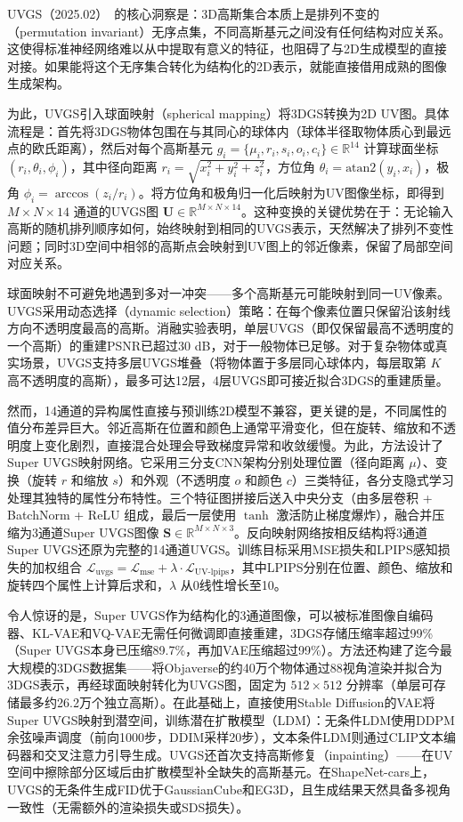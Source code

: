 UVGS（2025.02）~\cite{2502_01846}的核心洞察是：3D高斯集合本质上是排列不变的（permutation invariant）无序点集，不同高斯基元之间没有任何结构对应关系。这使得标准神经网络难以从中提取有意义的特征，也阻碍了与2D生成模型的直接对接。如果能将这个无序集合转化为结构化的2D表示，就能直接借用成熟的图像生成架构。

为此，UVGS引入球面映射（spherical mapping）将3DGS转换为2D UV图。具体流程是：首先将3DGS物体包围在与其同心的球体内（球体半径取物体质心到最远点的欧氏距离），然后对每个高斯基元 $g_i = \{\mu_i, r_i, s_i, o_i, c_i\} \in \mathbb{R}^{14}$ 计算球面坐标 $(r_i, \theta_i, \phi_i)$，其中径向距离 $r_i = \sqrt{x_i^2 + y_i^2 + z_i^2}$，方位角 $\theta_i = \text{atan2}(y_i, x_i)$，极角 $\phi_i = \arccos(z_i / r_i)$。将方位角和极角归一化后映射为UV图像坐标，即得到 $M \times N \times 14$ 通道的UVGS图 $\mathbf{U} \in \mathbb{R}^{M \times N \times 14}$。这种变换的关键优势在于：无论输入高斯的随机排列顺序如何，始终映射到相同的UVGS表示，天然解决了排列不变性问题；同时3D空间中相邻的高斯点会映射到UV图上的邻近像素，保留了局部空间对应关系。

球面映射不可避免地遇到多对一冲突——多个高斯基元可能映射到同一UV像素。UVGS采用动态选择（dynamic selection）策略：在每个像素位置只保留沿该射线方向不透明度最高的高斯。消融实验表明，单层UVGS（即仅保留最高不透明度的一个高斯）的重建PSNR已超过30 dB，对于一般物体已足够。对于复杂物体或真实场景，UVGS支持多层UVGS堆叠（将物体置于多层同心球体内，每层取第 $K$ 高不透明度的高斯），最多可达12层，4层UVGS即可接近拟合3DGS的重建质量。

然而，14通道的异构属性直接与预训练2D模型不兼容，更关键的是，不同属性的值分布差异巨大。邻近高斯在位置和颜色上通常平滑变化，但在旋转、缩放和不透明度上变化剧烈，直接混合处理会导致梯度异常和收敛缓慢。为此，方法设计了Super UVGS映射网络。它采用三分支CNN架构分别处理位置（径向距离 $\mu$）、变换（旋转 $r$ 和缩放 $s$）和外观（不透明度 $o$ 和颜色 $c$）三类特征，各分支隐式学习处理其独特的属性分布特性。三个特征图拼接后送入中央分支（由多层卷积 + BatchNorm + ReLU 组成，最后一层使用 $\tanh$ 激活防止梯度爆炸），融合并压缩为3通道Super UVGS图像 $\mathbf{S} \in \mathbb{R}^{M \times N \times 3}$。反向映射网络按相反结构将3通道Super UVGS还原为完整的14通道UVGS。训练目标采用MSE损失和LPIPS感知损失的加权组合 $\mathcal{L}_{\text{uvgs}} = \mathcal{L}_{\text{mse}} + \lambda \cdot \mathcal{L}_{\text{UV-lpips}}$，其中LPIPS分别在位置、颜色、缩放和旋转四个属性上计算后求和，$\lambda$ 从0线性增长至10。

令人惊讶的是，Super UVGS作为结构化的3通道图像，可以被标准图像自编码器、KL-VAE和VQ-VAE无需任何微调即直接重建，3DGS存储压缩率超过99\%（Super UVGS本身已压缩89.7\%，再加VAE压缩超过99\%）。方法还构建了迄今最大规模的3DGS数据集——将Objaverse的约40万个物体通过88视角渲染并拟合为3DGS表示，再经球面映射转化为UVGS图，固定为 $512 \times 512$ 分辨率（单层可存储最多约26.2万个独立高斯）。在此基础上，直接使用Stable Diffusion的VAE将Super UVGS映射到潜空间，训练潜在扩散模型（LDM）：无条件LDM使用DDPM余弦噪声调度（前向1000步，DDIM采样20步），文本条件LDM则通过CLIP文本编码器和交叉注意力引导生成。UVGS还首次支持高斯修复（inpainting）——在UV空间中擦除部分区域后由扩散模型补全缺失的高斯基元。在ShapeNet-cars上，UVGS的无条件生成FID优于GaussianCube和EG3D，且生成结果天然具备多视角一致性（无需额外的渲染损失或SDS损失）。

